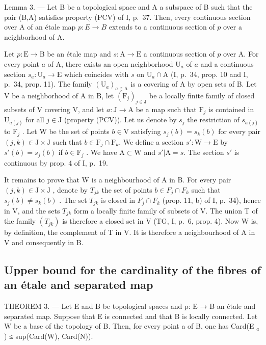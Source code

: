 Lemma 3. --- Let B be a topological space and A a subspace of B such that the pair (B,A) satisfies property (PCV) of I, p.~37. Then, every continuous section over A of an étale map \(p\colon E \to B\) extends to a continuous section of \(p\) over a neighborhood of A.

Let \(p \colon \mathrm{E} \to \mathrm{B}\) be an étale map and \(s \colon \mathrm{A} \to \mathrm{E}\) a continuous section of \(p\) over A. For every point \(a\) of A, there exists an open neighborhood \(\mathrm{U}_a\) of \(a\) and a continuous section \(s_a \colon \mathrm{U}_a \to \mathrm{E}\) which coincides with \(s\) on \(\mathrm{U}_a \cap \mathrm{A}\) (I, p.~34, prop. 10 and I, p.~34, prop. 11). The family \((\mathrm{U}_a)_{a \in \mathrm{A}}\) is a covering of A by open sets of B. Let V be a neighborhood of A in B, let \((\mathrm{F}_j)_{j \in \mathrm{J}}\) be a locally finite family of closed subsets of V covering V, and let \(a \colon \mathrm{J} \to \mathrm{A}\) be a map such that \(\mathrm{F}_j\) is contained in \(\mathrm{U}_{a(j)}\) for all \(j \in \mathrm{J}\) (property (PCV)). Let us denote by \(s_j\) the restriction of \(s_{a(j)}\) to \(\mathrm{F}_j\) . Let W be the set of points \(b \in \mathrm{V}\) satisfying \(s_j(b) = s_k(b)\) for every pair \((j, k) \in \mathrm{J} \times \mathrm{J}\) such that \(b \in \mathrm{F}_j \cap \mathrm{F}_k\). We define a section \(s' \colon \mathrm{W} \to \mathrm{E}\) by \(s'(b) = s_j(b)\) if \(b \in \mathrm{F}_j\) . We have \(\mathrm{A} \subset \mathrm{W}\) and \(s' | \mathrm{A} = s\). The section \(s'\) is continuous by prop. 4 of I, p.~19.

It remains to prove that W is a neighbourhood of A in B. For every pair \((j,k)\in\mathrm{J}\times\mathrm{J}\) , denote by \(T_{jk}\) the set of points \(b\in F_{j}\cap F_{k}\) such that \(s_{j}(b)\neq s_{k}(b)\) . The set \(T_{jk}\) is closed in \(F_{j}\cap F_{k}\) (prop. 11, b) of I, p.~34), hence in V, and the sets \(T_{jk}\) form a locally finite family of subsets of V. The union T of the family \((T_{jk})\) is therefore a closed set in V (TG, I, p.~6, prop. 4). Now W is, by definition, the complement of T in V. It is therefore a neighbourhood of A in V and consequently in B.

\subsection{Upper bound for the cardinality of the fibres of an étale and separated map}

THEOREM 3. --- Let E and B be topological spaces and p: E → B an étale and separated map. Suppose that E is connected and that B is locally connected. Let W be a base of the topology of B. Then, for every point a of B, one has Card(E \(_{a}\) ) ≤ sup(Card(W), Card(N)).


